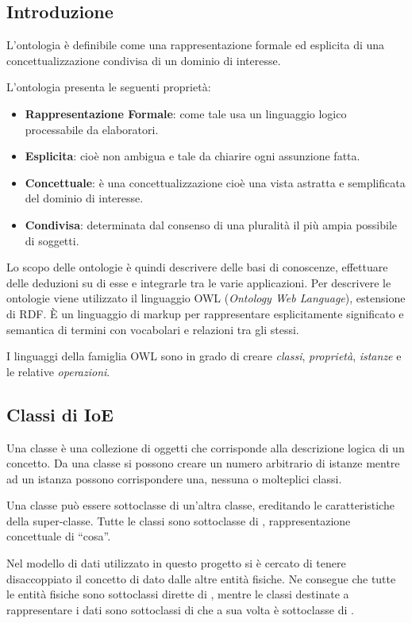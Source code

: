 \subsection{Introduzione}

L'ontologia è definibile come una rappresentazione formale ed esplicita di una concettualizzazione condivisa di un dominio di interesse.

L'ontologia presenta le seguenti proprietà:

\begin{itemize}
	\item \textbf{Rappresentazione Formale}: come tale usa un linguaggio logico processabile da elaboratori.
	\item \textbf{Esplicita}: cioè non ambigua e tale da chiarire ogni assunzione fatta.
	\item \textbf{Concettuale}: è una concettualizzazione cioè una vista astratta e semplificata del dominio di interesse.
	\item \textbf{Condivisa}: determinata dal consenso di una pluralità il più ampia possibile di soggetti.
\end{itemize}

Lo scopo delle ontologie è quindi descrivere delle basi di conoscenze, effettuare delle deduzioni su di esse e integrarle tra le varie applicazioni. Per descrivere le ontologie viene utilizzato il linguaggio OWL (\emph{Ontology Web Language}), estensione di RDF. È un linguaggio di markup per rappresentare esplicitamente significato e semantica di termini con vocabolari e relazioni tra gli stessi.

I linguaggi della famiglia OWL sono in grado di creare \emph{classi}, \emph{proprietà}, \emph{istanze} e le relative \emph{operazioni}.


\subsection{Classi di IoE}

Una classe è una collezione di oggetti che corrisponde alla descrizione logica di un concetto. Da una classe si possono creare un numero arbitrario di istanze mentre ad un istanza possono corrispondere una, nessuna o molteplici classi.

Una classe può essere sottoclasse di un'altra classe, ereditando le caratteristiche della super-classe. Tutte le classi sono sottoclasse di , rappresentazione concettuale di ``cosa''.

Nel modello di dati utilizzato in questo progetto si è cercato di tenere disaccoppiato il concetto di dato dalle altre entità fisiche. Ne consegue che tutte le entità fisiche sono sottoclassi dirette di , mentre le classi destinate a rappresentare i dati sono sottoclassi di  che a sua volta è sottoclasse di .

